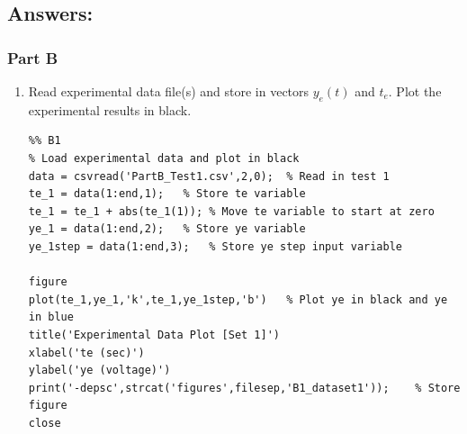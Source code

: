 \documentclass[11pt,a4paper]{article}
\begin{document}
\pagebreak
\subsection{Answers:}
\subsubsection{Part B}
\begin{enumerate}
	\item Read experimental data file(s) and store in vectors $y_e(t)$ and $t_e$. Plot the experimental results in black.
    
    \begin{lstlisting}
%% B1
% Load experimental data and plot in black
data = csvread('PartB_Test1.csv',2,0);  % Read in test 1
te_1 = data(1:end,1);   % Store te variable
te_1 = te_1 + abs(te_1(1)); % Move te variable to start at zero
ye_1 = data(1:end,2);   % Store ye variable
ye_1step = data(1:end,3);   % Store ye step input variable

figure
plot(te_1,ye_1,'k',te_1,ye_1step,'b')   % Plot ye in black and ye in blue
title('Experimental Data Plot [Set 1]')
xlabel('te (sec)')
ylabel('ye (voltage)')
print('-depsc',strcat('figures',filesep,'B1_dataset1'));    % Store figure
close
    \end{lstlisting}

	
    
  \begin{figure}[H]
	

\end{figure}
\end{enumerate}
\end{document}
